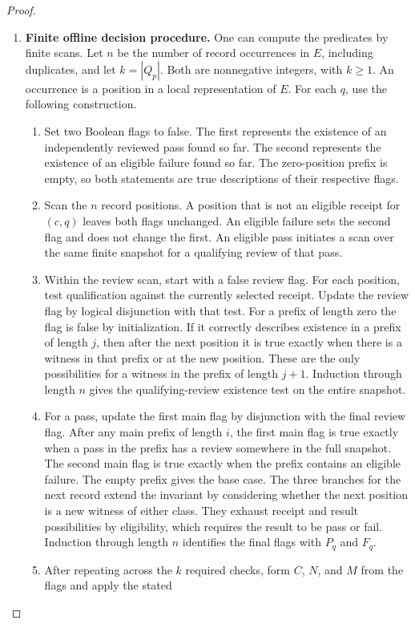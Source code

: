 \begin{proof}
\begin{enumerate}
\item \textbf{Finite offline decision procedure.}
One can compute the predicates by finite scans.
Let $n$ be the number of record occurrences in $E$,
including duplicates, and let $k=|Q_p|$.
Both are nonnegative integers, with $k\ge 1$.
An occurrence is a position in a local representation of $E$.
For each $q$, use the following construction.
\begin{enumerate}
\item Set two Boolean flags to false.
The first represents the existence of an independently
reviewed pass found so far.
The second represents the existence of an eligible failure
found so far.
The zero-position prefix is empty, so both statements
are true descriptions of their respective flags.
\item Scan the $n$ record positions.
A position that is not an eligible receipt for $(c,q)$
leaves both flags unchanged.
An eligible failure sets the second flag and does not
change the first.
An eligible pass initiates a scan over the same finite
snapshot for a qualifying review of that pass.
\item Within the review scan, start with a false review flag.
For each position, test qualification against the currently
selected receipt.
Update the review flag by logical disjunction with that test.
For a prefix of length zero the flag is false by initialization.
If it correctly describes existence in a prefix of length $j$,
then after the next position it is true exactly when
there is a witness in that prefix or at the new position.
These are the only possibilities for a witness in the
prefix of length $j+1$.
Induction through length $n$ gives the qualifying-review
existence test on the entire snapshot.
\item For a pass, update the first main flag by disjunction
with the final review flag.
After any main prefix of length $i$, the first main flag is true
exactly when a pass in the prefix has a review somewhere
in the full snapshot.
The second main flag is true exactly when the prefix contains
an eligible failure.
The empty prefix gives the base case.
The three branches for the next record extend the invariant
by considering whether the next position is a new witness
of either class.
They exhaust receipt and result possibilities by eligibility,
which requires the result to be pass or fail.
Induction through length $n$ identifies the final flags
with $P_q$ and $F_q$.
\item After repeating across the $k$ required checks, form
$C$, $N$, and $M$ from the flags and apply the stated

\end{enumerate}
\end{enumerate}
\end{proof}
